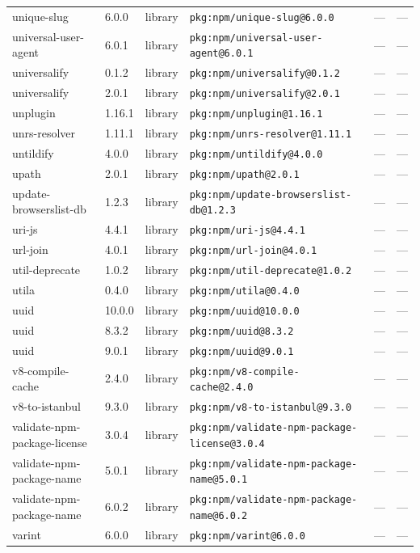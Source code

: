 \documentclass[11pt]{article}
\begin{document}
\begin{longtable}{|l|l|l|p{2.2cm}|l|p{4cm}|}
unique-slug & 6.0.0 & library & \texttt{pkg:npm/unique-slug@6.0.0} & — & — \\
universal-user-agent & 6.0.1 & library & \texttt{pkg:npm/universal-user-agent@6.0.1} & — & — \\
universalify & 0.1.2 & library & \texttt{pkg:npm/universalify@0.1.2} & — & — \\
universalify & 2.0.1 & library & \texttt{pkg:npm/universalify@2.0.1} & — & — \\
unplugin & 1.16.1 & library & \texttt{pkg:npm/unplugin@1.16.1} & — & — \\
unrs-resolver & 1.11.1 & library & \texttt{pkg:npm/unrs-resolver@1.11.1} & — & — \\
untildify & 4.0.0 & library & \texttt{pkg:npm/untildify@4.0.0} & — & — \\
upath & 2.0.1 & library & \texttt{pkg:npm/upath@2.0.1} & — & — \\
update-browserslist-db & 1.2.3 & library & \texttt{pkg:npm/update-browserslist-db@1.2.3} & — & — \\
uri-js & 4.4.1 & library & \texttt{pkg:npm/uri-js@4.4.1} & — & — \\
url-join & 4.0.1 & library & \texttt{pkg:npm/url-join@4.0.1} & — & — \\
util-deprecate & 1.0.2 & library & \texttt{pkg:npm/util-deprecate@1.0.2} & — & — \\
utila & 0.4.0 & library & \texttt{pkg:npm/utila@0.4.0} & — & — \\
uuid & 10.0.0 & library & \texttt{pkg:npm/uuid@10.0.0} & — & — \\
uuid & 8.3.2 & library & \texttt{pkg:npm/uuid@8.3.2} & — & — \\
uuid & 9.0.1 & library & \texttt{pkg:npm/uuid@9.0.1} & — & — \\
v8-compile-cache & 2.4.0 & library & \texttt{pkg:npm/v8-compile-cache@2.4.0} & — & — \\
v8-to-istanbul & 9.3.0 & library & \texttt{pkg:npm/v8-to-istanbul@9.3.0} & — & — \\
validate-npm-package-license & 3.0.4 & library & \texttt{pkg:npm/validate-npm-package-license@3.0.4} & — & — \\
validate-npm-package-name & 5.0.1 & library & \texttt{pkg:npm/validate-npm-package-name@5.0.1} & — & — \\
validate-npm-package-name & 6.0.2 & library & \texttt{pkg:npm/validate-npm-package-name@6.0.2} & — & — \\
varint & 6.0.0 & library & \texttt{pkg:npm/varint@6.0.0} & — & — \\

\end{longtable}
\end{document}
